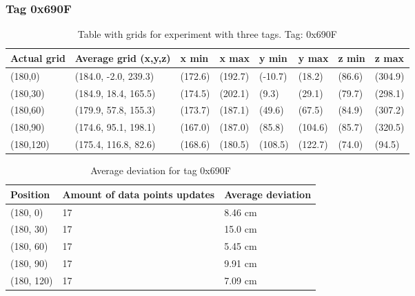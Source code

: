 \subsubsection{Tag 0x690F}
\begin{table}[H]
    \begin{tabular}{|l|l|l|l|l|l|l|l|}
        \hline
        Actual grid & Average grid (x,y,z) & x min   & x max   & y min   & y max   & z min  & z max   \\ \hline
        (180,0)     & (184.0, -2.0, 239.3) & (172.6) & (192.7) & (-10.7) & (18.2)  & (86.6) & (304.9) \\ \hline
        (180,30)    & (184.9, 18.4, 165.5) & (174.5) & (202.1) & (9.3)   & (29.1)  & (79.7) & (298.1) \\ \hline
        (180,60)    & (179.9, 57.8, 155.3) & (173.7) & (187.1) & (49.6)  & (67.5)  & (84.9) & (307.2) \\ \hline
        (180,90)    & (174.6, 95.1, 198.1) & (167.0) & (187.0) & (85.8)  & (104.6) & (85.7) & (320.5) \\ \hline
        (180,120)   & (175.4, 116.8, 82.6) & (168.6) & (180.5) & (108.5) & (122.7) & (74.0) & (94.5)  \\ \hline
    \end{tabular}
    \label{Tab:three-tag-experiment-result-tag-0x690F}
    \caption{Table with grids for experiment with three tags. Tag: 0x690F}
\end{table}

\begin{table}[H]
    \centering
    \begin{tabular}{|l|l|l|}
        \hline
        Position   & Amount of data points updates & Average deviation \\ \hline
        (180, 0)   & 17                            & 8.46 cm           \\ \hline
        (180, 30)  & 17                            & 15.0 cm           \\ \hline
        (180, 60)  & 17                            & 5.45 cm           \\ \hline
        (180, 90)  & 17                            & 9.91 cm           \\ \hline
        (180, 120) & 17                            & 7.09 cm           \\ \hline
    \end{tabular}
    \caption{Average deviation for tag 0x690F}
\end{table}

